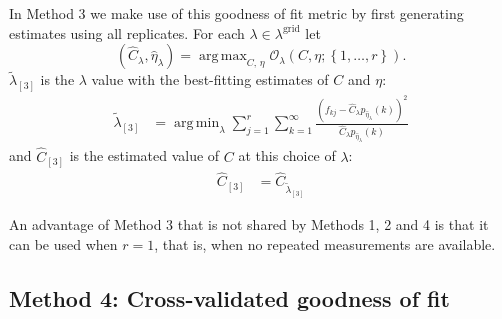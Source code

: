 \documentclass[12pt]{article}
\DeclareMathOperator*{\argmin}{arg\,min}
\DeclareMathOperator*{\argmax}{arg\,max}
\newcommand{\lambdagrid}{\lambda^{\text{grid}}}
\begin{document}
In Method 3 we make use of this goodness of fit metric by first generating estimates using all replicates.  For each $\lambda \in \lambdagrid$ let
\begin{equation}
\left(\widehat{C}_{\lambda}, \widehat{\eta}_{\lambda} \right) = \argmax_{C, \, \eta} \mathcal{O}_\lambda \left(C, \eta; \left\{1, \dots, r \right\} \right). \label{eq:c_hat_lambdas_method_3}
\end{equation}
$\widetilde{\lambda}_{[3]}$ is the $\lambda$ value with the best-fitting estimates of $C$ and $\eta$:
\begin{align}
\widetilde{\lambda}_{[3]} &= \argmin_{\lambda} \sum_{j=1}^r \sum_{k=1}^{\infty} \frac{ \left( f_{kj} - \widehat{C}_{\lambda} p_{\widehat{\eta}_{\lambda}}(k) \right)^2}{\widehat{C}_{\lambda}p_{\widehat{\eta}_{\lambda}}(k)} \label{eq:selected_lambda_3}
\end{align}
and $\widehat{C}_{[3]}$ is the estimated value of $C$ at this choice of $\lambda$:
\begin{align}
\widehat{C}_{[3]} &= \widehat{C}_{\widetilde{\lambda}_{[3]}}
\end{align}

An advantage of Method 3 that is not shared by Methods 1, 2 and 4 is that it can be used when $r=1$, that is, when no repeated measurements are available.

\subsection{Method 4: Cross-validated goodness of fit}
\end{document}
